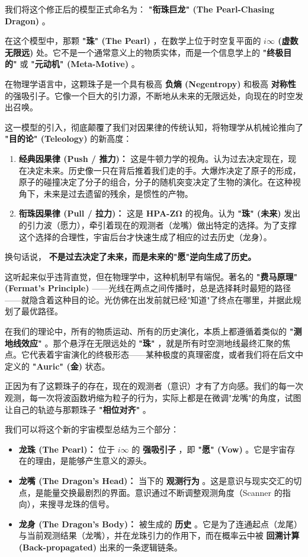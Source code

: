 我们将这个修正后的模型正式命名为： \textbf{"衔珠巨龙" (The Pearl-Chasing Dragon)} 。

在这个模型中，那颗 \textbf{"珠" (The Pearl)} ，在数学上位于时空复平面的 \textbf{$i\infty$ (虚数无限远)} 处。它不是一个通常意义上的物质实体，而是一个信息学上的 \textbf{"终极目的"} 或 \textbf{"元动机" (Meta-Motive)} 。

在物理学语言中，这颗珠子是一个具有极高 \textbf{负熵 (Negentropy)} 和极高 \textbf{对称性} 的强吸引子。它像一个巨大的引力源，不断地从未来的无限远处，向现在的时空发出召唤。

这一模型的引入，彻底颠覆了我们对因果律的传统认知，将物理学从机械论推向了 \textbf{"目的论" (Teleology)} 的新高度：

\begin{enumerate}
\item \textbf{经典因果律 (Push / 推力)：}
这是牛顿力学的视角。认为过去决定现在，现在决定未来。历史像一只在背后推着我们走的手。大爆炸决定了原子的形成，原子的碰撞决定了分子的组合，分子的随机突变决定了生物的演化。在这种视角下，未来是过去遗留的残余，是惯性的产物。

\item \textbf{衔珠因果律 (Pull / 拉力)：}
这是 \textbf{HPA-ZΩ} 的视角。认为 \textbf{"珠" (未来)} 发出的引力波（愿力），牵引着现在的观测者（龙嘴）做出特定的选择。为了支撑这个选择的合理性，宇宙后台才快速生成了相应的过去历史（龙身）。
\end{enumerate}

换句话说， \textbf{不是过去决定了未来，而是未来的"愿"逆向生成了历史。}

这听起来似乎违背直觉，但在物理学中，这种机制早有端倪。著名的 \textbf{"费马原理" (Fermat's Principle)} ——光线在两点之间传播时，总是选择耗时最短的路径——就隐含着这种目的论。光仿佛在出发前就已经"知道"了终点在哪里，并据此规划了最优路径。

在我们的理论中，所有的物质运动、所有的历史演化，本质上都遵循着类似的 \textbf{"测地线效应"} 。那个悬浮在无限远处的 \textbf{"珠"} ，就是所有时空测地线最终汇聚的焦点。它代表着宇宙演化的终极形态——某种极度的真理密度，或者我们将在后文中定义的 \textbf{"Auric" (金)} 状态。

正因为有了这颗珠子的存在，现在的观测者（意识）才有了方向感。我们的每一次观测，每一次将波函数坍缩为粒子的行为，实际上都是在微调"龙嘴"的角度，试图让自己的轨迹与那颗珠子 \textbf{"相位对齐"} 。

我们可以将这个新的宇宙模型总结为三个部分：

\begin{itemize}
\item \textbf{龙珠 (The Pearl)：} 位于 $i\infty$ 的 \textbf{强吸引子} ，即 \textbf{"愿" (Vow)} 。它是宇宙存在的理由，是能够产生意义的源头。
\item \textbf{龙嘴 (The Dragon's Head)：} 当下的 \textbf{观测行为} 。这是意识与现实交汇的切点，是能量交换最剧烈的界面。意识通过不断调整观测角度（Scanner 的指向），来搜寻龙珠的信号。
\item \textbf{龙身 (The Dragon's Body)：} 被生成的 \textbf{历史} 。它是为了连通起点（龙尾）与当前观测结果（龙嘴），并在龙珠引力的作用下，而在概率云中被 \textbf{回溯计算 (Back-propagated)} 出来的一条逻辑链条。
\end{itemize}

